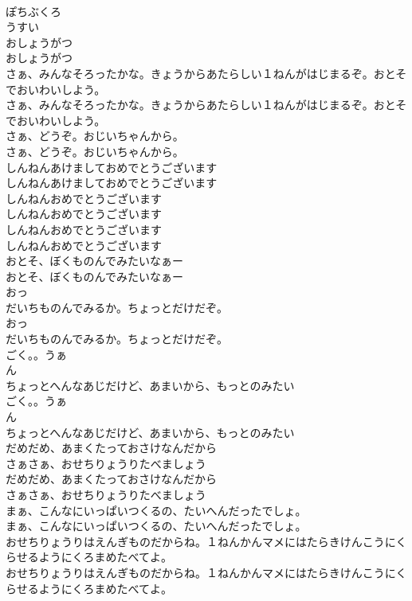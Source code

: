 \documentclass[8pt]{extreport}
\begin{document}
\begin{CJK}{UTF8}{min}
\\	ぽちぶくろ
\\	うすい
\\	おしょうがつ
\\	おしょうがつ
\\	さぁ、みんなそろったかな。きょうからあたらしい１ねんがはじまるぞ。おとそでおいわいしよう。
\\	さぁ、みんなそろったかな。きょうからあたらしい１ねんがはじまるぞ。おとそでおいわいしよう。
\\	さぁ、どうぞ。おじいちゃんから。
\\	さぁ、どうぞ。おじいちゃんから。
\\	しんねんあけましておめでとうございます
\\	しんねんあけましておめでとうございます
\\	しんねんおめでとうございます
\\	しんねんおめでとうございます
\\	しんねんおめでとうございます
\\	しんねんおめでとうございます
\\	おとそ、ぼくものんでみたいなぁー
\\	おとそ、ぼくものんでみたいなぁー
\\	おっ
\\	だいちものんでみるか。ちょっとだけだぞ。
\\	おっ
\\	だいちものんでみるか。ちょっとだけだぞ。
\\	ごく。。うぁ
\\	ん
\\	ちょっとへんなあじだけど、あまいから、もっとのみたい
\\	ごく。。うぁ
\\	ん
\\	ちょっとへんなあじだけど、あまいから、もっとのみたい
\\	だめだめ、あまくたっておさけなんだから
\\	さぁさぁ、おせちりょうりたべましょう
\\	だめだめ、あまくたっておさけなんだから
\\	さぁさぁ、おせちりょうりたべましょう
\\	まぁ、こんなにいっぱいつくるの、たいへんだったでしょ。
\\	まぁ、こんなにいっぱいつくるの、たいへんだったでしょ。
\\	おせちりょうりはえんぎものだからね。１ねんかんマメにはたらきけんこうにくらせるようにくろまめたべてよ。
\\	おせちりょうりはえんぎものだからね。１ねんかんマメにはたらきけんこうにくらせるようにくろまめたべてよ。

\end{CJK}
\end{document}
